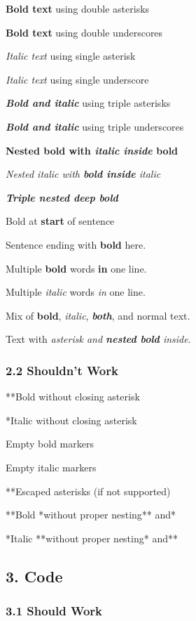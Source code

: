 \documentclass{article}
\begin{document}
\textbf{Bold text} using double asterisks

\textbf{Bold text} using double underscores

\emph{Italic text} using single asterisk

\emph{Italic text} using single underscore

\textbf{\emph{Bold and italic}} using triple asterisks

\textbf{\emph{Bold and italic}} using triple underscores

\textbf{Nested bold with \emph{italic inside} bold}

\emph{Nested italic with \textbf{bold inside} italic}

\textbf{\emph{Triple nested \textbf{deep} bold}}

Bold at \textbf{start} of sentence

Sentence ending with \textbf{bold} here.

Multiple \textbf{bold} words \textbf{in} one line.

Multiple \emph{italic} words \emph{in} one line.

Mix of \textbf{bold}, \emph{italic}, \textbf{\emph{both}}, and normal text.

Text with \emph{asterisk and \textbf{nested bold} inside}.

\subsubsection{ 2.2 Shouldn't Work}

**Bold without closing asterisk

*Italic without closing asterisk

\textbf{ }Empty bold markers

\emph{ }Empty italic markers

**Escaped asterisks (if not supported)

**Bold *without proper nesting** and*

*Italic **without proper nesting* and**

\noindent\hrulefill

\subsection{ 3. Code}

\subsubsection{ 3.1 Should Work}
\end{document}
